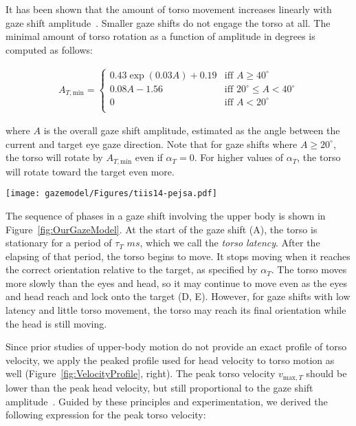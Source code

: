 It has been shown that the amount of torso movement increases linearly with gaze shift amplitude~\citep{mccluskey2007monkeys}. Smaller gaze shifts do not engage the torso at all. The minimal amount of torso rotation as a function of amplitude in degrees is computed as follows:

\begin{align}
\label{eq:TorsoAmin}
A_{T,\mathrm{min}} = \begin{cases}
0.43 \mathop{exp}(0.03 A) + 0.19 & \mbox{iff } A \geq 40^{\circ} \\
0.08 A - 1.56 & \mbox{iff } 20^{\circ} \leq A < 40^{\circ} \\
0 & \mbox{iff } A < 20^{\circ} \\
\end{cases}
\end{align}

where $A$ is the overall gaze shift amplitude, estimated as the angle between the current and target eye gaze direction. Note that for gaze shifts where $A \geq 20^{\circ}$, the torso will rotate by $A_{T,\mathrm{min}}$ even if $\alpha_T = 0$. For higher values of $\alpha_T$, the torso will rotate toward the target even more.

\begin{figure*}
\centering
\texttt{[image: gazemodel/Figures/tiis14-pejsa.pdf]}
\caption{Movement phases of the eyes, head, and torso in a gaze shift. Dashed area indicates that the torso may stop moving before or after the head.}
\label{fig:OurGazeModel}
\end{figure*}

The sequence of phases in a gaze shift involving the upper body is shown in Figure~\ref{fig:OurGazeModel}. At the start of the gaze shift (A), the torso is stationary for a period of $\tau_T$ $ms$, which we call the \emph{torso latency}. After the elapsing of that period, the torso begins to move. It stops moving when it reaches the correct orientation relative to the target, as specified by $\alpha_T$. The torso moves more slowly than the eyes and head, so it may continue to move even as the eyes and head reach and lock onto the target (D, E). However, for gaze shifts with low latency and little torso movement, the torso may reach its final orientation while the head is still moving.

Since prior studies of upper-body motion do not provide an exact profile of torso velocity, we apply the peaked profile used for head velocity to torso motion as well (Figure~\ref{fig:VelocityProfile}, right). The peak torso velocity $v_{\mathrm{max},T}$ should be lower than the peak head velocity, but still proportional to the gaze shift amplitude~\citep{mccluskey2007monkeys}. Guided by these principles and experimentation, we derived the following expression for the peak torso velocity:

